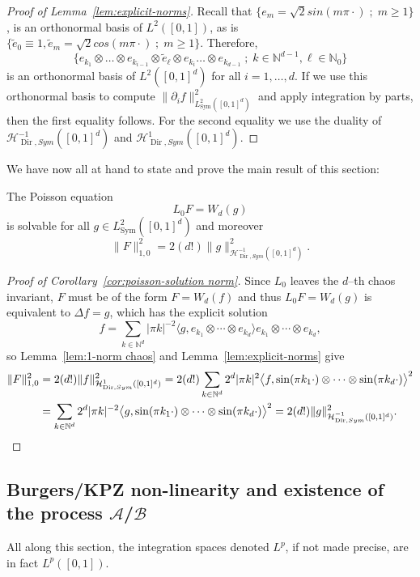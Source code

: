 \documentclass[AHL,Unicode,longabstracts]{cedram}
\DeclareMathOperator{\Dir}{Dir}
\DeclareMathOperator{\Sym}{Sym}
\newcommand{\mc}[1]{{\mathcal #1}}
\renewcommand{\mc}[1]{{\mathcal #1}}
\newcommand{\NN}{\mathbb N}
\renewcommand{\ge}{\geqslant}
\renewcommand{\tilde}{\widetilde}
\begin{document}
\begin{proof}[Proof of Lemma~\ref{lem:explicit-norms}]
Recall that $\{e_m = \sqrt{2} sin(m \pi \cdot)\; ; \; m \ge 1\}$, is an orthonormal basis of $L^2([0,1])$, as is $\{\tilde e_0 \equiv 1, \tilde e_m = \sqrt{2} cos(m \pi \cdot) \; ;\; m \ge 1\}$. Therefore,
\[
\big\{e_{k_1} \otimes \dots \otimes e_{k_{i-1}} \otimes \tilde e_\ell \otimes e_{k_i} \dots \otimes e_{k_{d-1}}\; ; \; k \in \NN^{d-1}, \ell \in \NN_0\big\}
\]
is an orthonormal basis of $L^2([0,1]^d)$ for all $i = 1,\dots, d$. If we use this orthonormal basis to compute $\| \partial_{i} f \|_{L^2_{\Sym} ([0, 1]^d)}^2$ and apply integration by parts, then the first equality follows. For the second equality we use the duality of $\mc H_{\Dir, Sym}^{-1} ([0, 1]^d)$ and $\mc H_{\Dir, Sym}^1 ([0, 1]^d)$.
\end{proof}

We have now all at hand to state and prove the main result of this section:

\begin{coro}\label{cor:poisson-solution norm}
The Poisson equation
\[
L_0 F = W_d (g)
\]
is solvable for all $g \in L^2_{\Sym} ([0, 1]^d)$ and moreover
\[
\| F \|_{1,0}^2 = 2 (d!)\| g
\|_{\mc H_{\Dir, Sym}^{-1} ([0, 1]^d)}^2.
\]
\end{coro}

\begin{proof}[Proof of Corollary~\ref{cor:poisson-solution norm}]
Since $L_0$ leaves the $d$--th chaos invariant, $F$ must be of the form $F = W_d (f)$ and thus $L_0 F = W_d (g)$ is equivalent to $\Delta f = g$, which has the explicit solution
\[
f = \sum_{k \in \mathbb{N}^d} | \pi k |^{- 2} \big\langle g, e_{k_1} \otimes \cdots \otimes e_{k_d} \big\rangle e_{k_1}\otimes \cdots \otimes e_{k_d},
\]
so Lemma~\ref{lem:1-norm chaos} and Lemma~\ref{lem:explicit-norms} give
\begin{align*}
\| F \|_{1,0}^2 & = 2 (d!) \| f \|_{\mc H_{\Dir, Sym}^1 ([0, 1]^d)}^2 = 2 (d!) \sum_{k \in
\mathbb{N}^d} 2^d | \pi k |^2 \big\langle f, \sin (\pi k_1 \cdot) \otimes
\cdots \otimes \sin (\pi k_d \cdot) \big\rangle^2\\
& = \sum_{k \in \mathbb{N}^d} 2^d | \pi k |^{- 2} \big\langle g, \sin (\pi k_1
\cdot) \otimes \cdots \otimes \sin (\pi k_d \cdot) \big\rangle^2 = 2 (d!) \| g \|_{\mc H_{\Dir, Sym}^{-1} ([0, 1]^d)}^2.\qedhere
\end{align*}
\end{proof}

\subsection{Burgers/KPZ non-linearity and existence of the process \texorpdfstring{$\mc A$}{A}/\texorpdfstring{$\mc B$}{B}}\label{ssec:construct}
All along this section, the integration spaces denoted $L^p$, if not made precise, are in fact $L^p([0,1])$.
\end{document}
